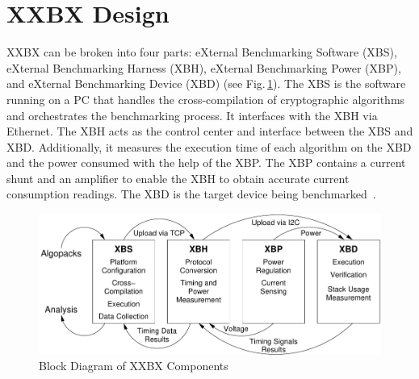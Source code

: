 \documentclass[10pt]{article}
\begin{document}
\section{XXBX Design}

XXBX can be broken into four parts: eXternal Benchmarking Software (XBS), eXternal 
Benchmarking Harness (XBH), eXternal Benchmarking Power (XBP), and 
eXternal Benchmarking Device (XBD) (see Fig.\,\ref{fig:xxbx_block}). 
The XBS is the software running on a PC that handles
the cross-compilation of cryptographic algorithms and orchestrates the benchmarking 
process. It interfaces with the XBH via Ethernet.  
The XBH acts as the control center and interface between the XBS and XBD. Additionally, it 
measures the execution time of each algorithm on the XBD and the power consumed with the 
help of the XBP. The XBP contains a current shunt and an amplifier to enable the XBH 
to obtain accurate current consumption readings. The XBD is the target device being benchmarked~\cite{xxbx}.

\begin{figure}[ht]
    \centering
    \includegraphics[scale=0.8]{../figures/xxbx_block.pdf}
    \caption{Block Diagram of XXBX Components}
    \label{fig:xxbx_block}
\end{figure}
\end{document}
